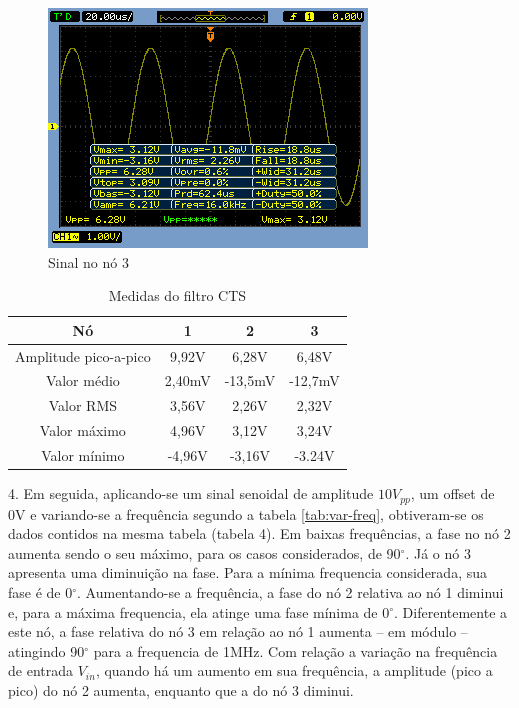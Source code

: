 \documentclass[a4paper]{article} %
\begin{document}
\begin{figure}[h!]
\begin{centering}
\includegraphics[scale=0.7]{Imagens/3}\caption{Sinal no nó 3 \label{fig:Fig-3}}
\par\end{centering}
\end{figure}
\newpage
%
\begin{table}[h!]
\begin{centering}
\caption{Medidas do filtro CTS \label{tab:Medidas-do-filtro}}
\begin{tabular}{|c|c|c|c|}
\hline 
Nó & 1 & 2 & 3\tabularnewline
\hline
\hline 
Amplitude pico-a-pico & 9,92V  & 6,28V  & 6,48V \tabularnewline
\hline 
Valor médio & 2,40mV & -13,5mV  & -12,7mV \tabularnewline
\hline 
Valor RMS & 3,56V & 2,26V  & 2,32V \tabularnewline
\hline 
Valor máximo & 4,96V & 3,12V  & 3,24V \tabularnewline
\hline 
Valor mínimo & -4,96V  & -3,16V  & -3.24V \tabularnewline
\hline
\end{tabular}
\par\end{centering}


\end{table}

4. Em seguida, aplicando-se um sinal senoidal de amplitude  $10V_{pp}$, um offset de 0V e variando-se a frequência segundo a tabela \ref{tab:var-freq}, obtiveram-se os dados contidos na mesma tabela (tabela 4). Em baixas frequências,  a fase no nó 2 aumenta sendo o seu máximo, para os casos considerados, de 90$^{\circ}$. Já o nó 3 apresenta uma diminuição na fase. Para a mínima frequencia considerada, sua fase é de 0$^{\circ}$.  Aumentando-se a frequência, a fase do nó 2 relativa ao nó 1 diminui e, para a máxima frequencia, ela atinge uma fase mínima de 0$^{\circ}$. Diferentemente a este nó, a fase relativa do nó 3 em relação ao nó 1 aumenta – em módulo – atingindo 90$^{\circ}$ para  a frequencia de 1MHz.
                Com relação a variação na frequência de entrada $V_{in}$, quando há um aumento em sua frequência, a amplitude (pico a pico) do nó 2 aumenta,  enquanto que a do nó 3 diminui.  
\end{document}
